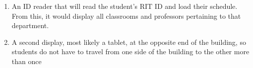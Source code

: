 \begin{enumerate}
	\item An ID reader that will read the student's RIT ID and load their schedule. From this, it would display all classrooms and professors pertaining to that department.
	\item A second display, most likely a tablet, at the opposite end of the building, so students do not have to travel from one side of the building to the other more than once
\end{enumerate}